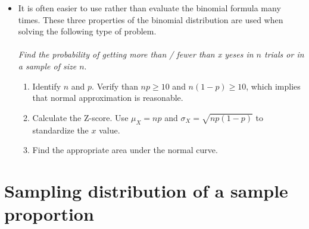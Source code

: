 \begin{itemize}
\item It is often easier to use  rather than evaluate the binomial formula many times. These three properties of the binomial distribution are used when solving the following type of problem.  
\\
\\ \textit{Find the probability of getting more than / fewer than x yeses in $n$ trials or in a sample of size $n$}.  
\begin{enumerate}\vspace{-1mm}
\setlength{\itemsep}{0mm}
\item Identify $n$ and $p$. Verify than $np\ge 10$ and $n(1-p)\ge 10$, which implies that normal approximation is reasonable. 
\item Calculate the Z-score.  Use $\mu_{\scriptscriptstyle{X}} = np$ and $\sigma_{\scriptscriptstyle{X}} = \sqrt{np(1-p)}$ to standardize the $x$ value.  
\item Find the appropriate area under the normal curve.   
\end{enumerate}

\end{itemize}


{}



\section[Sampling distribution of a sample proportion]{Sampling distribution of a sample proportion }
\label{distributionphat}

